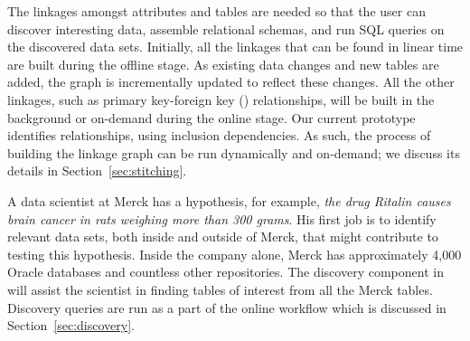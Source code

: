  The linkages amongst attributes and tables
are needed so that the user can discover interesting data, assemble relational
schemas, and run \textsf{SQL} queries on the discovered data sets. 
Initially, all the linkages that can be found in linear time are built during the offline stage. As existing data changes and new tables are added, the graph is incrementally updated to reflect these changes. All the other linkages, such as primary key-foreign key (\pkfk) relationships, will be
built in the background or on-demand during the online stage. Our current
prototype identifies \pkfk relationships, using inclusion dependencies. As such,
the process of building the linkage graph can be run dynamically and on-demand;
we discuss its details in Section~\ref{sec:stitching}.



\stitle{[Discovery.]} A data scientist at Merck has a hypothesis, for example,
{\it the drug Ritalin causes brain cancer in rats weighing more than 300 grams}.
His first job is to identify relevant data sets, both inside and outside of
Merck, that might contribute to testing this hypothesis. Inside the company
alone, Merck has approximately 4,000 Oracle databases and countless other
repositories. The discovery component in \dcv will assist the scientist in
finding tables of interest from all the Merck tables. Discovery queries are run
as a part of the online workflow which is discussed in
Section~\ref{sec:discovery}.





